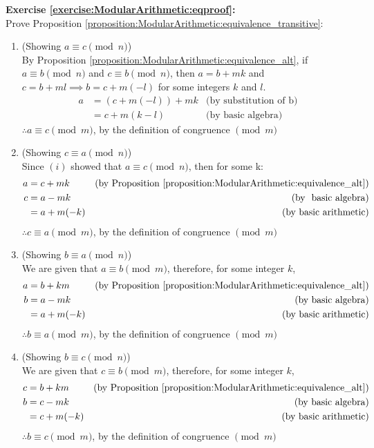 \noindent\textbf{Exercise \ref{exercise:ModularArithmetic:eqproof}:}\\ %
Prove Proposition \ref{proposition:ModularArithmetic:equivalence_transitive}:
\begin{enumerate}
\item 
(Showing $a \equiv c \pmod{n}$)\\
By Proposition \ref{proposition:ModularArithmetic:equivalence_alt}, if $a \equiv b \pmod{n}$ and $c \equiv b \pmod{n}$, then $a = b + mk$ and $c = b + ml \implies b = c + m(-l)$ for some integers $k$ and $l$.
		\begin{align*}
		a&= (c + m(-l)) + mk &\text{(by substitution of b)}\\
		&= c + m(k-l) &\text{(by basic algebra)}
		\end{align*}
$\therefore a \equiv c \pmod{m}$, by the definition of congruence $\pmod{m}$
            
\item
(Showing $c \equiv a \pmod{n}$)\\
Since $(i)$ showed that $a \equiv c \pmod{n}$, then for some k:
		\begin{align*}
		a&= c + mk &\text{(by Proposition \ref{proposition:ModularArithmetic:equivalence_alt})}\\
		c&= a - mk &\text{(by~ basic algebra)}\\
		&= a + m(-k) &\text{(by basic arithmetic)}
		\end{align*}
$\therefore c \equiv a \pmod{m}$, by the definition of congruence $\pmod{m}$\\
            
\item
(Showing $b \equiv a \pmod{n}$)\\
We are given that $a \equiv b \pmod{m}$, therefore, for some integer $k$,
		\begin{align*}
		a&= b + km &\text{(by Proposition \ref{proposition:ModularArithmetic:equivalence_alt})}\\
		b&= a - mk &\text{(by basic algebra)}\\
		&= a + m(-k) &\text{(by basic arithmetic)}
		\end{align*}
$\therefore b \equiv a \pmod{m}$, by the definition of congruence $\pmod{m}$\\
            
\item
(Showing $b \equiv c \pmod{n}$)\\
We are given that $c \equiv b \pmod{m}$, therefore, for some integer $k$,
		\begin{align*}
		c&= b + km &\text{(by Proposition \ref{proposition:ModularArithmetic:equivalence_alt})}\\
		b&= c - mk &\text{(by basic algebra)}\\
		&= c + m(-k) &\text{(by basic arithmetic)}
		\end{align*}
$\therefore b \equiv c \pmod{m}$, by the definition of congruence $\pmod{m}$\\
\end{enumerate}

